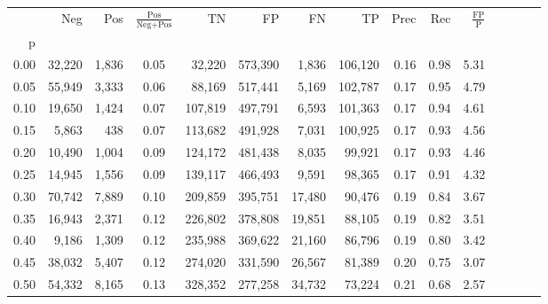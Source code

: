 \begin{tabular}{rrrcrrrrrrrrrrr}
\toprule
{} &     Neg &     Pos & $\frac{\text{Pos}}{\text{Neg}+\text{Pos}}$ &       TN &       FP &       FN &       TP &  Prec &   Rec & $\frac{\text{FP}}{\text{P}}$ \\
p    &         &         &                                            &          &          &          &          &       &       &                              \\
\midrule
0.00 &  32,220 &   1,836 &                                       0.05 &   32,220 &  573,390 &    1,836 &  106,120 &  0.16 &  0.98 &                         5.31 \\
0.05 &  55,949 &   3,333 &                                       0.06 &   88,169 &  517,441 &    5,169 &  102,787 &  0.17 &  0.95 &                         4.79 \\
0.10 &  19,650 &   1,424 &                                       0.07 &  107,819 &  497,791 &    6,593 &  101,363 &  0.17 &  0.94 &                         4.61 \\
0.15 &   5,863 &     438 &                                       0.07 &  113,682 &  491,928 &    7,031 &  100,925 &  0.17 &  0.93 &                         4.56 \\
0.20 &  10,490 &   1,004 &                                       0.09 &  124,172 &  481,438 &    8,035 &   99,921 &  0.17 &  0.93 &                         4.46 \\
0.25 &  14,945 &   1,556 &                                       0.09 &  139,117 &  466,493 &    9,591 &   98,365 &  0.17 &  0.91 &                         4.32 \\
0.30 &  70,742 &   7,889 &                                       0.10 &  209,859 &  395,751 &   17,480 &   90,476 &  0.19 &  0.84 &                         3.67 \\
0.35 &  16,943 &   2,371 &                                       0.12 &  226,802 &  378,808 &   19,851 &   88,105 &  0.19 &  0.82 &                         3.51 \\
0.40 &   9,186 &   1,309 &                                       0.12 &  235,988 &  369,622 &   21,160 &   86,796 &  0.19 &  0.80 &                         3.42 \\
0.45 &  38,032 &   5,407 &                                       0.12 &  274,020 &  331,590 &   26,567 &   81,389 &  0.20 &  0.75 &                         3.07 \\
0.50 &  54,332 &   8,165 &                                       0.13 &  328,352 &  277,258 &   34,732 &   73,224 &  0.21 &  0.68 &                         2.57 \\

\end{tabular}
